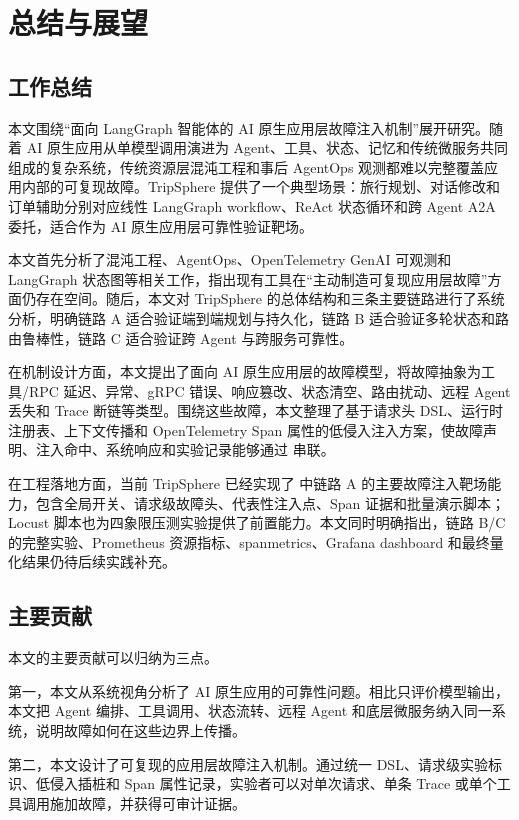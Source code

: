 \chapter{总结与展望}

\section{工作总结}

本文围绕“面向 LangGraph 智能体的 AI 原生应用层故障注入机制”展开研究。随着 AI 原生应用从单模型调用演进为 Agent、工具、状态、记忆和传统微服务共同组成的复杂系统，传统资源层混沌工程和事后 AgentOps 观测都难以完整覆盖应用内部的可复现故障。TripSphere 提供了一个典型场景：旅行规划、对话修改和订单辅助分别对应线性 LangGraph workflow、ReAct 状态循环和跨 Agent A2A 委托，适合作为 AI 原生应用层可靠性验证靶场。

本文首先分析了混沌工程、AgentOps、OpenTelemetry GenAI 可观测和 LangGraph 状态图等相关工作，指出现有工具在“主动制造可复现应用层故障”方面仍存在空间。随后，本文对 TripSphere 的总体结构和三条主要链路进行了系统分析，明确链路 A 适合验证端到端规划与持久化，链路 B 适合验证多轮状态和路由鲁棒性，链路 C 适合验证跨 Agent 与跨服务可靠性。

在机制设计方面，本文提出了面向 AI 原生应用层的故障模型，将故障抽象为工具/RPC 延迟、异常、gRPC 错误、响应篡改、状态清空、路由扰动、远程 Agent 丢失和 Trace 断链等类型。围绕这些故障，本文整理了基于请求头 DSL、运行时注册表、上下文传播和 OpenTelemetry Span 属性的低侵入注入方案，使故障声明、注入命中、系统响应和实验记录能够通过  串联。

在工程落地方面，当前 TripSphere 已经实现了  中链路 A 的主要故障注入靶场能力，包含全局开关、请求级故障头、代表性注入点、Span 证据和批量演示脚本；Locust 脚本也为四象限压测实验提供了前置能力。本文同时明确指出，链路 B/C 的完整实验、Prometheus 资源指标、spanmetrics、Grafana dashboard 和最终量化结果仍待后续实践补充。

\section{主要贡献}

本文的主要贡献可以归纳为三点。

第一，本文从系统视角分析了 AI 原生应用的可靠性问题。相比只评价模型输出，本文把 Agent 编排、工具调用、状态流转、远程 Agent 和底层微服务纳入同一系统，说明故障如何在这些边界上传播。

第二，本文设计了可复现的应用层故障注入机制。通过统一 DSL、请求级实验标识、低侵入插桩和 Span 属性记录，实验者可以对单次请求、单条 Trace 或单个工具调用施加故障，并获得可审计证据。

